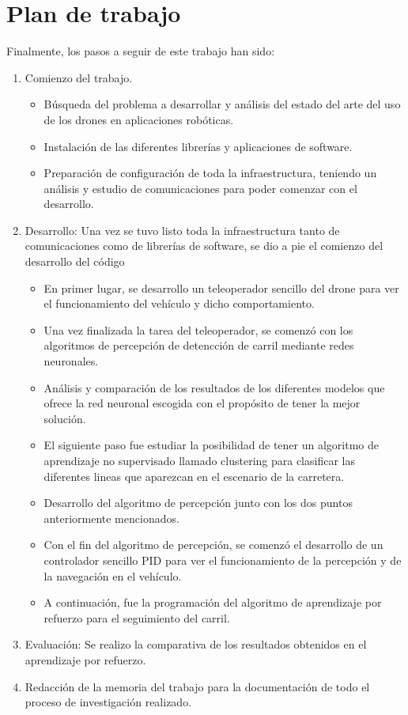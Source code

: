 \section{Plan de trabajo}
\label{sec:plantrabajo}

Finalmente, los pasos a seguir de este trabajo han sido: 
\begin{enumerate}
    \item Comienzo del trabajo. 
    \begin{itemize}
        \item Búsqueda del problema a desarrollar y análisis del estado del arte del uso de los drones en aplicaciones robóticas.
        \item Instalación de las diferentes librerías y aplicaciones de software. 
        \item Preparación de configuración de toda la infraestructura, teniendo un análisis y estudio de comunicaciones para poder comenzar con el desarrollo. 
    \end{itemize}
    \item Desarrollo: Una vez se tuvo listo toda la infraestructura tanto de comunicaciones como de librerías de software, se dio a pie el comienzo del desarrollo del código
        \begin{itemize}
            \item En primer lugar, se desarrollo un teleoperador sencillo del drone para ver el funcionamiento del vehículo y dicho comportamiento.
            \item Una vez finalizada la tarea del teleoperador, se comenzó con los algoritmos de percepción de detencción de carril mediante redes neuronales.
            \item Análisis y comparación de los resultados de los diferentes modelos que ofrece la red neuronal escogida con el propósito de tener la mejor solución. 
            \item El siguiente paso fue estudiar la posibilidad de tener un algoritmo de aprendizaje no supervisado llamado clustering para clasificar las diferentes lineas que aparezcan en el escenario de la carretera.
            \item Desarrollo del algoritmo de percepción junto con los dos puntos anteriormente mencionados.
            \item Con el fin del algoritmo de percepción, se comenzó el desarrollo de un controlador sencillo PID para ver el funcionamiento de la percepción y de la navegación en el vehículo. 
            \item A continuación, fue la programación del algoritmo de aprendizaje por refuerzo para el seguimiento del carril.
        \end{itemize}
    \item Evaluación: Se realizo la comparativa de los resultados obtenidos en el aprendizaje por refuerzo.
        
    \item Redacción de la memoria del trabajo para la documentación de todo el proceso de investigación realizado. 
\end{enumerate}


